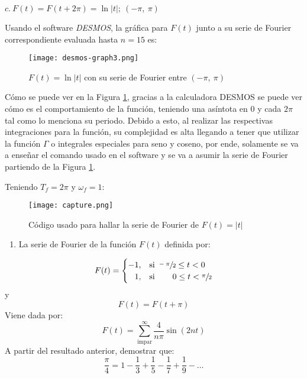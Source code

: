 \begin{multicols}{2}
$c.~F(t) = F(t+2\pi) = \ln|t|;~(-\pi,~\pi)$

Usando el software \textit{DESMOS}, la gráfica para $F(t)$ junto a su serie de Fourier correspondiente evaluada hasta $n=15$ es:

\begin{figure}[H]
\begin{center}
    \texttt{[image: desmos-graph3.png]}
    \caption{$F(t) = \ln |t|$ con su serie de Fourier entre $(-\pi,~\pi)$}
    \label{figdes:3}
\end{center}
\end{figure} 
    
Cómo se puede ver en la Figura \ref{figdes:3}, gracias a la calculadora DESMOS se puede ver cómo es el comportamiento de la función, teniendo una asíntota en 0 y cada $2\pi$ tal como lo menciona su periodo. Debido a esto, al realizar las respectivas integraciones para la función, su complejidad es alta llegando a tener que utilizar la función $\Gamma$ o integrales especiales para seno y coseno, por ende, solamente se va a enseñar el comando usado en el software y se va a asumir la serie de Fourier partiendo de la Figura \ref{figdes:3}.

Teniendo $T_f = 2\pi$ y $\omega_f = 1$:
\begin{figure}[H]
\begin{center}
    \texttt{[image: capture.png]}
    \caption{Código usado para hallar la serie de Fourier de $F(t)=|t|$}
    \label{capture}
\end{center}
\end{figure} 


\begin{enumerate}[leftmargin=15pt, resume]
    \item La serie de Fourier de la función $F(t)$ definida por:
\end{enumerate}

\begin{equation}
    F(t) =
    \begin{cases}
    -1,&\text{si } \sfrac{-\pi}{2} \leq t < 0\\
    \hphantom{-}1,&\text{si } \hspace{18pt} 0 \leq t < \sfrac{\pi}{2}
    \end{cases}
\label{enu:3}
\end{equation}
\hspace{12pt} y
\begin{equation*}
    F(t) = F\left(t + \pi\right)
\end{equation*}
\hspace{12pt} Viene dada por:
\begin{equation}
    F(t) = \sum_{\mathrm{impar}}^{\infty} \frac{4}{n\pi} \sin\left(2nt\right)
    \label{enu:4}
\end{equation}
\hspace{12pt} A partir del resultado anterior, demostrar que:
\begin{equation}
    \frac{\pi}{4} = 1 - \frac{1}{3} + \frac{1}{5} - \frac{1}{7} + \frac{1}{9} - \hdots
    \label{enu:5}
\end{equation}


\end{multicols}
